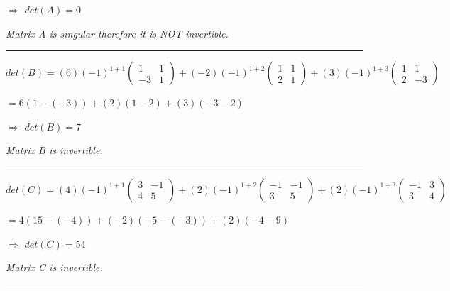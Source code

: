 \documentclass[fleqn]{article}
\begin{document}
\begin{enumerate}
    $\Rightarrow$ 
    $
      det(A)=0
    $

    \emph{Matrix A is singular therefore it is NOT invertible.}

    \rule{16cm}{0.4pt}

    \bigbreak

    $
      det(B)=
      (6)(-1)^{1+1}
      \begin{pmatrix}
        1 & 1 \\ 
        -3 & 1
      \end{pmatrix}
      +
      (-2)(-1)^{1+2}
      \begin{pmatrix}
        1 & 1 \\ 
        2 & 1
      \end{pmatrix}
      +
      (3)(-1)^{1+3}
      \begin{pmatrix}
        1 & 1 \\ 
        2 & -3
      \end{pmatrix}
    $

    $
      = 6(1-(-3))+(2)(1-2)+(3)(-3-2)
    $

    $\Rightarrow$ 
    $
      det(B)=7
    $

    \emph{Matrix B is invertible.}

    \rule{16cm}{0.4pt}

    \bigbreak

    $
    det(C)=
      (4)(-1)^{1+1}
      \begin{pmatrix}
        3 & -1 \\ 
        4 & 5
      \end{pmatrix}
      +
      (2)(-1)^{1+2}
      \begin{pmatrix}
        -1 & -1 \\ 
        3 & 5
      \end{pmatrix}
      +
      (2)(-1)^{1+3}
      \begin{pmatrix}
        -1 & 3 \\ 
        3 & 4
      \end{pmatrix}
    $

    $
      = 4(15-(-4))+(-2)(-5-(-3))+(2)(-4-9)
    $

    $\Rightarrow$ 
    $
      det(C)= 54
    $

    \emph{Matrix C is invertible.}

    \rule{16cm}{0.4pt}

    \bigbreak


\end{enumerate}
\end{document}
